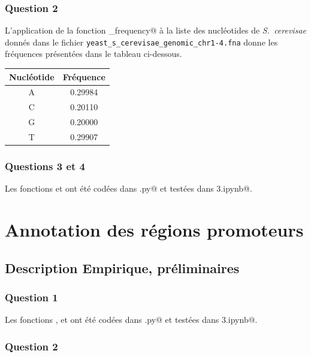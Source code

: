 \documentclass[a4paper,12pt]{article}
\begin{document}
\subsubsection*{Question 2}

L'application de la fonction \verb@nucleotide_frequency@ à la liste des nucléotides de \emph{S.\ cerevisae} donnés dans le fichier \texttt{yeast\_\allowbreak{}s\_\allowbreak{}cerevisae\_\allowbreak{}genomic\_\allowbreak{}chr1-4\allowbreak{}.fna} donne les fréquences présentées dans le tableau ci-dessous.

\begin{center}
\begin{tabular}{cc}
Nucléotide & Fréquence \tabularnewline
\hline
A & 0.29984 \tabularnewline
C & 0.20110 \tabularnewline
G & 0.20000 \tabularnewline
T & 0.29907 \tabularnewline
\end{tabular}
\end{center}

\subsubsection*{Questions 3 et 4}

Les fonctions \verb@logproba@ et \verb@logprobafast@ ont été codées dans \verb@projet.py@ et testées dans \verb@Projet3.ipynb@.

\section{Annotation des régions promoteurs}

\subsection{Description Empirique, préliminaires}
\label{SecDescriptionEmpirique}

\subsubsection*{Question 1}

Les fonctions \verb@code@, \verb@inverse@ et \verb@comptage@ ont été codées dans \verb@projet.py@ et testées dans \verb@Projet3.ipynb@.

\subsubsection*{Question 2}
\end{document}
